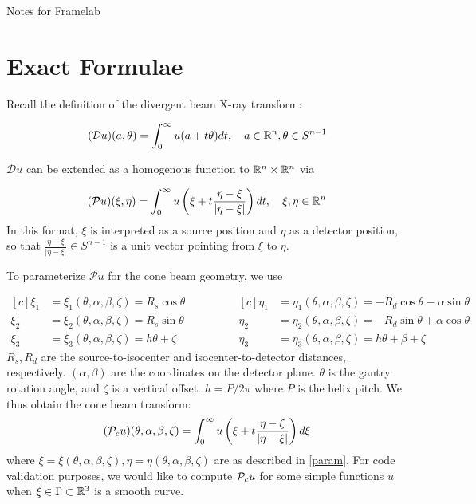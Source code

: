\documentclass[12pt]{article}
\begin{document}
\begin{center}
Notes for Framelab
\end{center}
\section{Exact Formulae}
Recall the definition of the divergent beam X-ray transform: 

\begin{align*}
(\mathcal{D} u)(a,\theta) = \int_0^\infty u(a+t\theta)dt,\quad a\in\R^n,\theta\in S^{n-1}
\end{align*}

$\mathcal{D}u$ can be extended as a homogenous function to $\R^n\times \R^n$ via 

\begin{align*}
(\mathcal{P}u)(\xi,\eta) = \int_0^\infty u\left(\xi+t\frac{\eta-\xi}{\vert \eta-\xi\vert}\right) dt ,\quad \xi,\eta\in\R^n
\end{align*} In this format, $\xi$ is interpreted as a source position and $\eta$ as a detector position, so that $\frac{\eta-\xi}{\vert \eta-\xi\vert}\in S^{n-1}$ is a unit vector pointing from $\xi$ to $\eta$.  

To parameterize $\mathcal{P}u$ for the cone beam geometry, we use 

\begin{equation}
\begin{aligned}[c]
\xi_1 &= \xi_1(\theta,\alpha,\beta,\zeta) = R_s\cos\theta \\
\xi_2 &= \xi_2(\theta,\alpha,\beta,\zeta) = R_s\sin\theta \\
\xi_3 &= \xi_3(\theta,\alpha,\beta,\zeta) = h\theta + \zeta
\end{aligned}\qquad \qquad
\begin{aligned}[c]
\eta_1 &= \eta_1(\theta,\alpha,\beta,\zeta) = -R_d\cos\theta-\alpha\sin\theta \\
\eta_2 &= \eta_2(\theta,\alpha,\beta,\zeta) = -R_d\sin\theta+\alpha\cos\theta \\
\eta_3 &= \eta_3(\theta,\alpha,\beta,\zeta) = h\theta + \beta + \zeta 
\end{aligned} \label{param}
\end{equation} $R_s,R_d$ are the source-to-isocenter and isocenter-to-detector distances, respectively.  $(\alpha,\beta)$ are the coordinates on the detector plane.  $\theta$ is the gantry rotation angle, and $\zeta$ is a vertical offset.  $h=P/2\pi$ where $P$ is the helix pitch.  We thus obtain the cone beam transform: 
\begin{align*}
(\P_cu)(\theta,\alpha,\beta,\zeta) = \int_0^\infty u\left(\xi+t\frac{\eta-\xi}{\vert \eta-\xi\vert}\right)d\xi
\end{align*}where $\xi=\xi(\theta,\alpha,\beta,\zeta),\eta=\eta(\theta,\alpha,\beta,\zeta)$ are as described in \eqref{param}.  For code validation purposes, we would like to compute $\P_cu$ for some simple functions $u$ when $\xi\in \Gamma\subset\R^3$ is a smooth curve. 
\end{document}
